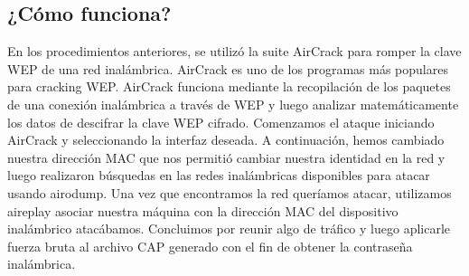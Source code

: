 \documentclass[11pt,a4paper]{scrartcl}			%
\begin{document}
\begin{multicols*}{2}
\begin{enumerate}
\end{enumerate}

\subsection{¿Cómo funciona?}

En los procedimientos anteriores, se utilizó la suite AirCrack para romper la clave WEP de una red inalámbrica. AirCrack es uno de los programas más populares para cracking WEP. AirCrack funciona mediante la recopilación de los paquetes de una conexión inalámbrica a través de WEP y luego analizar matemáticamente los datos de descifrar la clave WEP cifrado. Comenzamos el ataque iniciando AirCrack y seleccionando la interfaz deseada. A continuación, hemos cambiado nuestra dirección MAC que nos permitió cambiar nuestra identidad en la red y luego realizaron búsquedas en las redes inalámbricas disponibles para atacar usando airodump. Una vez que encontramos la red queríamos atacar, utilizamos aireplay asociar nuestra máquina con la dirección MAC del dispositivo inalámbrico atacábamos. Concluimos por reunir algo de tráfico y luego aplicarle fuerza bruta al archivo CAP generado con el fin de obtener la contraseña inalámbrica.

~\vfill

\end{multicols*}
\end{document}
